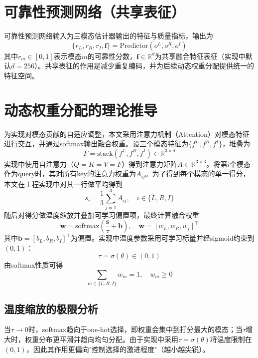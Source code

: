 \section{可靠性预测网络（共享表征）}
可靠性预测网络输入为三模态估计器输出的特征与质量指标，输出为
\begin{equation}
    \{r_{L}, r_{R}, r_{I}, \mathbf{f}\}=\mathrm{Predictor}(o^L, o^R, o^I)
\end{equation}
其中$r_m\in[0,1]$表示模态$m$的可靠性分数，$\mathbf{f}\in\mathbb{R}^{d}$为共享融合特征表征（实现中默认$d=256$）。共享表征的作用是减少重复编码，并为后续动态权重分配提供统一的特征空间。

\section{动态权重分配的理论推导}
为实现对模态贡献的自适应调整，本文采用注意力机制（Attention）\cite{vaswani2017attention}对模态特征进行交互，并通过softmax输出融合权重。设三个模态特征为$\{f^L,f^R,f^I\}$，堆叠为
\begin{equation}
    F = \mathrm{stack}(f^L,f^R,f^I)\in\mathbb{R}^{3 \times d}
\end{equation}
实现中使用自注意力（$Q=K=V=F$）得到注意力矩阵$A\in\mathbb{R}^{3\times 3}$。将第$i$个模态作为query时，其对所有key的注意力权重为$A_{ij}$。为了得到每个模态的单一得分，本文在工程实现中对其一行做平均得到
\begin{equation}
    s_i = \frac{1}{3}\sum_{j=1}^{3} A_{ij},\quad i\in\{L,R,I\}
\end{equation}
随后对得分做温度缩放并叠加可学习偏置项，最终计算融合权重
\begin{equation}
    \mathbf{w}=\mathrm{softmax}\left(\frac{\mathbf{s}}{\tau}+\mathbf{b}\right),\quad \mathbf{w}=[w_L,w_R,w_I]^\top
\end{equation}
其中$\mathbf{b}=[b_L,b_R,b_I]^\top$为偏置。实现中温度参数采用可学习标量并经sigmoid约束到$(0,1)$：
\begin{equation}
    \tau = \sigma(\theta)\in(0,1)
\end{equation}
由softmax性质可得
\begin{equation}
    \sum_{m\in\{L,R,I\}} w_m = 1,\quad w_m\ge 0
\end{equation}

\subsection{温度缩放的极限分析}
当$\tau\rightarrow 0$时，softmax趋向于one-hot选择，即权重会集中到打分最大的模态；当$\tau$增大时，权重分布更平滑并趋向均匀分配。由于实现中采用$\tau=\sigma(\theta)$将温度限制在$(0,1)$，因此其作用更偏向"控制选择的激进程度"（越小越尖锐）。

